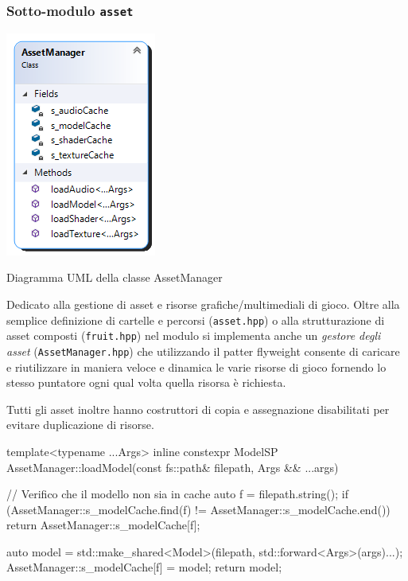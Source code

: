 \subsubsection{Sotto-modulo \texttt{asset}}
\begin{marginfigure}%
	\centering
	\includegraphics[width=0.8\linewidth]{images/ch20/2}
	\caption{Diagramma UML della classe AssetManager}
\end{marginfigure}
Dedicato alla gestione di asset e risorse grafiche/multimediali di gioco. Oltre alla semplice definizione di cartelle e percorsi (\texttt{asset.hpp}) o alla strutturazione di asset composti (\texttt{fruit.hpp}) nel modulo si implementa anche un \textit{gestore degli asset} (\texttt{AssetManager.hpp}) che utilizzando il patter flyweight consente di caricare e riutilizzare in maniera veloce e dinamica le varie risorse di gioco fornendo lo stesso puntatore ogni qual volta quella risorsa è richiesta.

Tutti gli asset inoltre hanno costruttori di copia e assegnazione disabilitati per evitare duplicazione di risorse.

\begin{cpp}[caption={Esempio di metodo utilizzata dal manager per il caricamento dei Modelli.}, captionpos=t]
template<typename ...Args>
inline constexpr ModelSP AssetManager::loadModel(const fs::path& filepath, Args && ...args)
{
	// Verifico che il modello non sia in cache
	auto f = filepath.string();
	if (AssetManager::s_modelCache.find(f) != AssetManager::s_modelCache.end())
	return AssetManager::s_modelCache[f];
	
	auto model = std::make_shared<Model>(filepath, std::forward<Args>(args)...);
	AssetManager::s_modelCache[f] = model;
	return model;
}
\end{cpp}


